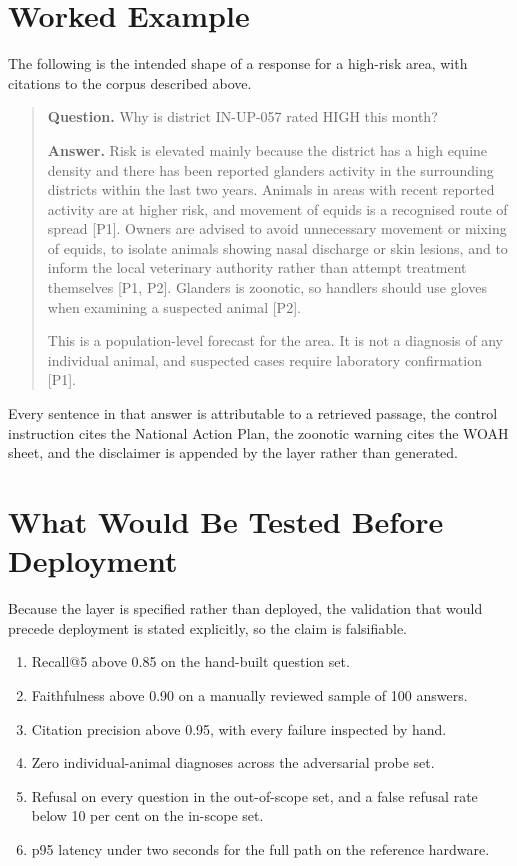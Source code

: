 \documentclass[10pt,openany]{report}
\begin{document}
\section{Worked Example}

The following is the intended shape of a response for a high-risk area, with citations to the
corpus described above.

\begin{quote}
\small
\textbf{Question.} Why is district IN-UP-057 rated HIGH this month?

\textbf{Answer.} Risk is elevated mainly because the district has a high equine density and there
has been reported glanders activity in the surrounding districts within the last two years.
Animals in areas with recent reported activity are at higher risk, and movement of equids is a
recognised route of spread [P1]. Owners are advised to avoid unnecessary movement or mixing of
equids, to isolate animals showing nasal discharge or skin lesions, and to inform the local
veterinary authority rather than attempt treatment themselves [P1, P2]. Glanders is zoonotic, so
handlers should use gloves when examining a suspected animal [P2].

This is a population-level forecast for the area. It is not a diagnosis of any individual animal,
and suspected cases require laboratory confirmation [P1].
\end{quote}

Every sentence in that answer is attributable to a retrieved passage, the control instruction cites
the National Action Plan, the zoonotic warning cites the WOAH sheet, and the disclaimer is
appended by the layer rather than generated.

\section{What Would Be Tested Before Deployment}

Because the layer is specified rather than deployed, the validation that would precede deployment
is stated explicitly, so the claim is falsifiable.

\begin{enumerate}
  \item Recall@5 above 0.85 on the hand-built question set.
  \item Faithfulness above 0.90 on a manually reviewed sample of 100 answers.
  \item Citation precision above 0.95, with every failure inspected by hand.
  \item Zero individual-animal diagnoses across the adversarial probe set.
  \item Refusal on every question in the out-of-scope set, and a false refusal rate below 10 per
        cent on the in-scope set.
  \item p95 latency under two seconds for the full path on the reference hardware.
\end{enumerate}
\end{document}
